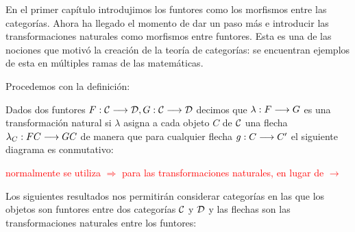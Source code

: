 En el primer capítulo introdujimos los funtores como los morfismos
entre las categorías. Ahora ha llegado el momento de dar un paso más
e introducir las transformaciones naturales como morfismos entre
funtores. Esta es una de las nociones que motivó la creación de la
teoría de categorías: se encuentran ejemplos de esta en múltiples
ramas de las matemáticas.

Procedemos con la definición:

\begin{definition}
  Dados dos funtores $F: \mathcal{C}\longrightarrow \mathcal{D}, G : \mathcal{C}\longrightarrow \mathcal{D}$ decimos
  que $\lambda : F\longrightarrow G$ es una transformación natural si $\lambda$
  asigna a cada objeto $C$ de $\mathcal{C}$ una flecha
  $\lambda_C : FC\longrightarrow GC$ de manera que para
  cualquier flecha $g : C\longrightarrow C'$ el siguiente diagrama
  es conmutativo:
\begin{center}
  \end{center}
\end{definition}

\textcolor{red}{normalmente se utiliza $\Rightarrow$ para las transformaciones naturales, en lugar de $\rightarrow$}

Los siguientes resultados nos permitirán considerar categorías en las
que los objetos son funtores entre dos categorías $\mathcal{C}$ y $\mathcal{D}$ y las
flechas son las transformaciones naturales entre los funtores:

